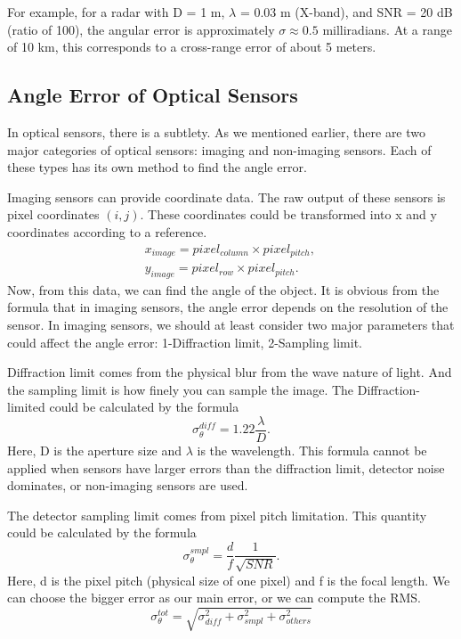 \documentclass{article}
\begin{document}
For example, for a radar with D = 1 m, $\lambda$ = 0.03 m (X-band), and SNR = 20 dB (ratio of 100), the angular error is approximately $\sigma \approx 0.5$ milliradians. At a range of 10 km, this corresponds to a cross-range error of about 5 meters.

\subsection{Angle Error of Optical Sensors}
In optical sensors, there is a subtlety. As we mentioned earlier, there are two major categories of optical sensors: imaging and non-imaging sensors. Each of these types has its own method to find the angle error.

Imaging sensors can provide coordinate data. The raw output of these sensors is pixel coordinates $(i, j)$. These coordinates could be transformed into x and y coordinates according to a reference.
\begin{align}
    x_{image} = pixel_{column} \times pixel_{pitch},\, \\
    y_{image} = pixel_{row} \times pixel_{pitch}.
\end{align}
Now, from this data, we can find the angle of the object. It is obvious from the formula that in imaging sensors, the angle error depends on the resolution of the sensor.
In imaging sensors, we should at least consider two major parameters that could affect the angle error: 1-Diffraction limit, 2-Sampling limit.

Diffraction limit comes from the physical blur from the wave nature of light. And the sampling limit is how finely you can sample the image.
The Diffraction-limited could be calculated by the formula
\begin{equation}
    \sigma_{\theta}^{diff} = 1.22 \frac{\lambda}{D}.
\end{equation}
Here, D is the aperture size and $\lambda$ is the wavelength.
This formula cannot be applied when sensors have larger errors than the diffraction limit, detector noise dominates, or non-imaging sensors are used.

The detector sampling limit comes from pixel pitch limitation. This quantity could be calculated by the formula
\begin{equation}
    \sigma_{\theta}^{smpl} = \frac{d}{f} \frac{1}{\sqrt{SNR}}.
\end{equation}
Here, d is the pixel pitch (physical size of one pixel) and f is the focal length.
We can choose the bigger error as our main error, or we can compute the RMS.
\begin{equation}
    \sigma_{\theta}^{tot} = \sqrt{\sigma_{diff}^2 + \sigma_{smpl}^2 + \sigma_{others}^2 }
\end{equation}
\end{document}
